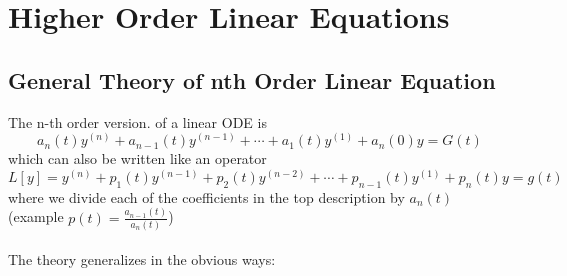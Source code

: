 \section*{Higher Order Linear Equations}
\subsection*{General Theory of nth Order Linear Equation}
The n-th order version. of a linear ODE is
\begin{equation*}
	a_n(t)y^{(n)} + a_{n-1}(t)y^{(n-1)} + \cdots + a_1(t)y^{(1)} + 	a_n(0)y = G(t)
\end{equation*}
which can also be written like an operator
\begin{equation*}
	L[y] = y^{(n)} + p_1(t)y^{(n-1)} + p_2(t) y^{(n-2)} + \cdots + p_{n-1}(t)y^{(1)} + p_n(t)y = g(t) \tag{$\star$}
\end{equation*}
where we divide each of the coefficients in the top description by $a_n(t)$ (example $p(t) = \frac{a_{n-1}(t)}{a_n(t)}$)\\\\
The theory generalizes in the obvious ways:
